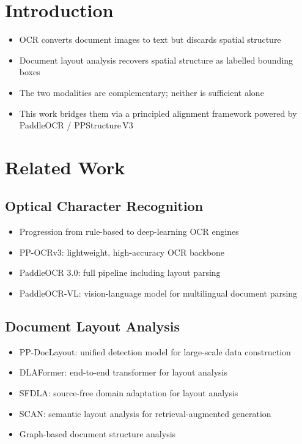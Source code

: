 \documentclass{article}
\theoremstyle{definition}
\begin{document}
\section{Introduction}
\begin{itemize}
  \item OCR converts document images to text but discards spatial structure
        \cite{ieee2025systematic}
  \item Document layout analysis recovers spatial structure as labelled bounding boxes
        \cite{PPDocLayout}
  \item The two modalities are complementary; neither is sufficient alone
  \item This work bridges them via a principled alignment framework powered by
        PaddleOCR / PPStructure\,V3 \cite{PaddleOCR30}
\end{itemize}

\section{Related Work}

\subsection{Optical Character Recognition}
\begin{itemize}
  \item Progression from rule-based to deep-learning OCR engines
        \cite{ieee2025systematic, yao2025analysis}
  \item PP-OCRv3: lightweight, high-accuracy OCR backbone \cite{PaddleOCRv3}
  \item PaddleOCR 3.0: full pipeline including layout parsing \cite{PaddleOCR30}
  \item PaddleOCR-VL: vision-language model for multilingual document parsing
        \cite{paddleocrvl2025}
\end{itemize}

\subsection{Document Layout Analysis}
\begin{itemize}
  \item PP-DocLayout: unified detection model for large-scale data construction
        \cite{PPDocLayout}
  \item DLAFormer: end-to-end transformer for layout analysis \cite{wang2024dlaformer}
  \item SFDLA: source-free domain adaptation for layout analysis \cite{tewes2025sfdla}
  \item SCAN: semantic layout analysis for retrieval-augmented generation
        \cite{scan2025semantic}
  \item Graph-based document structure analysis \cite{gdsa2025graph}
\end{itemize}
\end{document}

